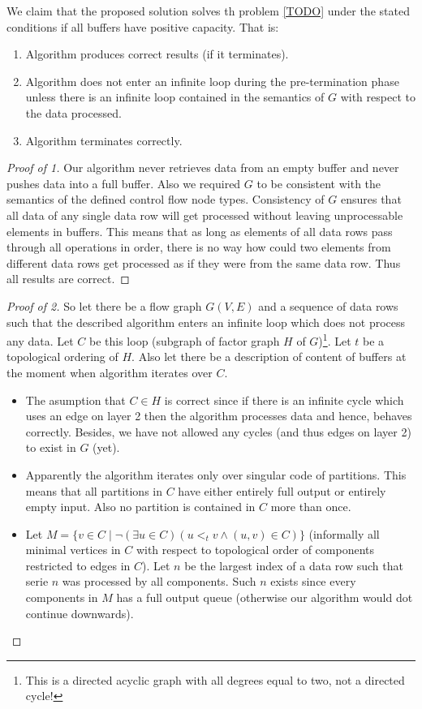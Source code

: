 \begin{claim}
  We claim that the proposed solution solves th problem \ref{TODO} under the stated conditions if all buffers have positive capacity. That is:
\begin{enumerate}
  \item Algorithm produces correct results (if it terminates).
  \item Algorithm does not enter an infinite loop during the pre-termination phase unless there is an infinite loop contained in the semantics of $G$ with respect to the data processed.
  \item Algorithm terminates correctly.
\end{enumerate}
\begin{proof}[Proof of 1]
  Our algorithm never retrieves data from an empty buffer and never pushes data into a full buffer. Also we required $G$ to be consistent with the semantics of the defined control flow node types.  
  Consistency of $G$ ensures that all data of any single data row will get processed without leaving unprocessable elements in buffers. This means that as long as elements of all data rows pass through all operations in order, there is no way how could two elements from different data rows get processed as if they were from the same data row.  Thus all results are correct. 
\end{proof}
\begin{proof}[Proof of 2] So let there be a flow graph $G(V,E)$ and a sequence of data rows such that the described algorithm enters an infinite loop which does not process any data. Let $C$ be this loop (subgraph of factor graph $H$ of $G$)\footnote{This is a directed acyclic graph with all degrees equal to two, not a directed cycle!}. Let $t$ be a topological ordering of $H$. Also let there be a description of content of buffers at the moment when algorithm iterates over $C$.
  \begin{itemize}
    \item The asumption that $C \in H$ is correct since if there is an infinite cycle which uses an edge on layer 2 then the algorithm processes data and hence, behaves correctly. Besides, we have not allowed any cycles (and thus edges on layer 2) to exist in $G$ (yet).
    \item Apparently the algorithm iterates only over singular code of partitions. This means that all partitions in $C$ have either entirely full output or entirely empty input. Also no partition is contained in $C$ more than once.
    \item Let $M = \{v \in C \mid \neg (\exists u \in C)( u <_t v \land (u,v) \in C )\}$ (informally all minimal vertices in $C$ with respect to topological order of components restricted to edges in $C$). Let $n$ be the largest index of a data row such that serie $n$ was processed by all components. Such $n$ exists since every components in $M$ has a full output queue (otherwise our algorithm would dot continue downwards).


\end{itemize}
\end{proof}
\end{claim}
